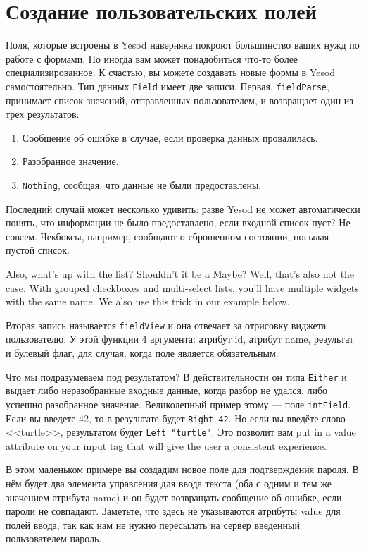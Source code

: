 \section{Создание пользовательских полей}
Поля, которые встроены в Yesod наверняка покроют большинство ваших нужд по 
работе с формами. Но иногда вам может понадобиться что-то более специализированное.
К счастью, вы можете создавать новые формы в Yesod самостоятельно. Тип данных
\lstinline'Field' имеет две записи. Первая, \lstinline'fieldParse', принимает 
список значений, отправленных пользователем, и возвращает один из трех результатов:
\begin{enumerate}
 \item Сообщение об ошибке в случае, если проверка данных провалилась.
 \item Разобранное значение.
 \item \lstinline'Nothing', сообщая, что данные не были предоставлены.
\end{enumerate}	

Последний случай может несколько удивить: разве Yesod не может автоматически понять,
что информации не было предоставлено, если входной список пуст? Не совсем. Чекбоксы,
например, сообщают о сброшенном состоянии, посылая пустой список.

Also, what's up with the list?  
Shouldn't it be a Maybe? Well, that's also not the case.
With grouped checkboxes and multi-select lists, you'll have multiple widgets with the same
name. We also use this trick in our example below.

Вторая запись называется \lstinline'fieldView' и она отвечает за отрисовку виджета
пользователю. У этой функции 4 аргумента: атрибут id, атрибут name, результат и булевый флаг, 
для случая, когда поле является обязательным.

Что мы подразумеваем под результатом? В действительности он типа \lstinline'Either'
и выдает либо неразобранные входные данные, когда разбор не удался, либо успешно 
разобранное значение. Великолепный пример этому --- поле \lstinline'intField'.
Если вы введете 42, то в результате будет \lstinline'Right 42'. Но если вы введёте
слово <<turtle>>, результатом будет \lstinline'Left "turtle"'. Это позволит вам
put in a value attribute on your input tag
that will give the user a consistent experience.

В этом маленьком примере вы создадим новое поле для подтверждения пароля. В нём будет
два элемента управления для ввода текста (оба с одним и тем же значением атрибута name)
и он будет возвращать сообщение об ошибке, если пароли не совпадают. Заметьте, что
здесь не указываются атрибуты value для полей ввода, так как нам не нужно пересылать 
на сервер введенный пользователем пароль.

